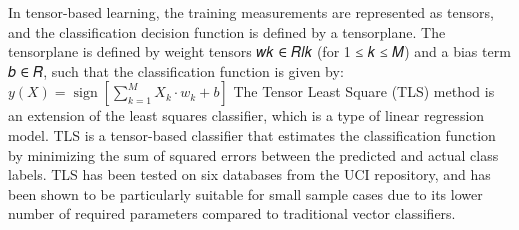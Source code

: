 \documentclass{article}
\theoremstyle{mytheoremstyle}
\theoremstyle{mytheoremstyle}
\theoremstyle{myproblemstyle}
\begin{document}
In tensor-based learning, the training measurements are represented as tensors, and the classification decision function is defined by a tensorplane. The tensorplane is defined by weight tensors 𝑤𝑘 ∈ 𝑅𝑙𝑘 (for 1 ≤ 𝑘 ≤ 𝑀) and a bias term 𝑏 ∈ 𝑅, such that the classification function is given by:
\begin{math}
	y(X) = \operatorname{sign}\left[\sum_{k=1}^{M} X_k \cdot w_k + b\right]
\end{math}
The Tensor Least Square (TLS) method is an extension of the least squares classifier, which is a type of linear regression model. TLS is a tensor-based classifier that estimates the classification function by minimizing the sum of squared errors between the predicted and actual class labels. TLS has been tested on six databases from the UCI repository, and has been shown to be particularly suitable for small sample cases due to its lower number of required parameters compared to traditional vector classifiers.
\end{document}
